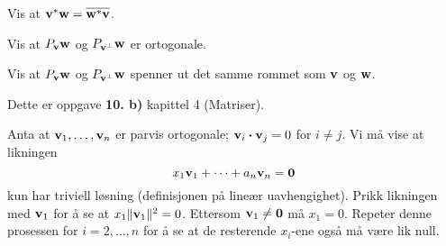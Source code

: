 \begin{oppgave}
Vis at $\mathbf{v}^* \mathbf{w}=\overline{\mathbf{w}^* \mathbf{v}}$.
\end{oppgave}

\begin{oppgave}
Vis at $P_{\mathbf{v}}\mathbf{w}$ og $P_{\mathbf{v}^{\perp}}\mathbf{w}$ er ortogonale.
\end{oppgave}

\begin{oppgave}
Vis at $P_{\mathbf{v}}\mathbf{w}$ og $P_{\mathbf{v}^{\perp}}\mathbf{w}$ spenner ut det samme rommet som $\mathbf{v}$ og $\mathbf{w}$.
\end{oppgave}




\begin{losning}
\begin{punkt}
Dette er oppgave \textbf{10. b)} kapittel 4 (Matriser).
\end{punkt}
\begin{punkt}
Anta at $\mathbf{v}_1,\dots,\mathbf{v}_n$ er parvis ortogonale; $\mathbf{v}_i\boldsymbol{\cdot}\mathbf{v}_j=0$ for $i\neq j$. Vi må vise at likningen $$x_1\mathbf{v}_1+\dots+a_n\mathbf{v}_n=\mathbf{0}$$ kun har triviell løsning (definisjonen på lineær uavhengighet). Prikk likningen med $\mathbf{v}_1$ for å se at $x_1\|\mathbf{v}_1\|^2=0$. Ettersom $\mathbf{v}_1\neq \mathbf{0}$ må $x_1=0$. Repeter denne prosessen for $i=2,\dots,n$ for å se at de resterende $x_i$-ene også må være lik null.
\end{punkt}
\end{losning}

